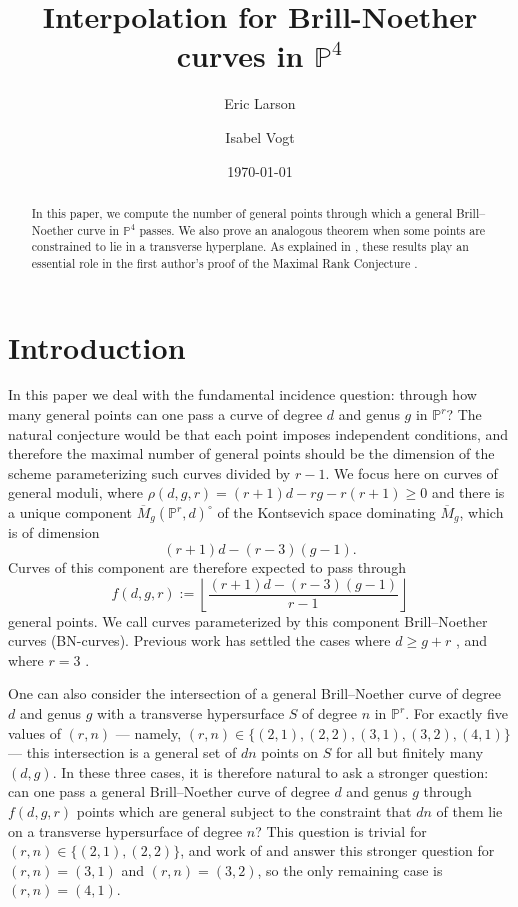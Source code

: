 \documentclass[11pt]{amsart}
\newcommand{\pp}{\mathbb{P}}
\renewcommand{\bar}{\overline}
\newcommand{\defi}[1]{\textsf{#1}}
\theoremstyle{definition}
\theoremstyle{remark}
\begin{document}
\title[Interpolation for curves in $\pp^4$]{Interpolation for Brill-Noether curves in $\pp^4$}
\author{Eric Larson}
\address{Department of Mathematics, Stanford University, Stanford, CA 94305}
\author{Isabel Vogt}
\address{Department of Mathematics, Massachusetts Institute of Technology, Cambridge, MA 02139}
\date{\today}

\maketitle

\begin{abstract}
In this paper, we compute the number of general points through which a general Brill--Noether curve in $\pp^4$ passes.
We also prove an analogous theorem when some points
are constrained to lie in a transverse hyperplane.  As explained in \cite{over}, these results play an essential role in the first author's proof of the Maximal Rank Conjecture \cite{mrc}.
\end{abstract}

\section{Introduction}

In this paper we deal with the fundamental incidence question: through how many general points can one pass a curve of degree $d$ and genus $g$ in $\pp^r$?  The natural conjecture would be that each point imposes independent conditions, and therefore the maximal number of general points should be the dimension of the scheme parameterizing such curves divided by $r-1$.
We focus here on curves of general moduli, where $\rho(d,g,r) = (r+1)d - rg - r(r+1) \geq 0$ and there is a unique component $\bar{M}_g(\pp^r, d)^\circ$ of the Kontsevich space dominating $\bar{M}_g$,
which is of dimension
\[(r + 1) d - (r - 3)(g - 1).\]
Curves of this component are therefore expected to pass through
\[f(d, g, r) := \left\lfloor \frac{(r + 1)d - (r - 3)(g - 1)}{r - 1}\right\rfloor\]
general points.
We call curves parameterized by this component \defi{Brill--Noether curves} (BN-curves).  Previous work has settled the cases where $d \geq g + r$ \cite{joint}, and where $r=3$ \cite{vogt}.  


One can also consider the intersection of a general Brill--Noether curve
of degree $d$ and genus $g$ with a transverse hypersurface $S$ of degree $n$ in $\pp^r$.
For exactly five values of $(r, n)$ --- namely, $(r, n) \in \{(2,1),(2,2),(3, 1), (3, 2), (4, 1)\}$ --- this
intersection is a general set of $dn$ points on $S$
for all but finitely many $(d, g)$.
In these three cases, it is therefore natural to ask a stronger question: can
one pass a general Brill--Noether curve of degree $d$ and genus $g$
through $f(d, g, r)$ points which are general subject to the constraint that
$dn$ of them lie on a transverse hypersurface of degree $n$?
This question is trivial for $(r,n) \in \{(2,1), (2,2)\}$, and work of \cite{vogt} and \cite{quadrics} answer this stronger question
for $(r, n) = (3, 1)$ and $(r, n) = (3, 2)$,
so the only remaining case is $(r, n) = (4, 1)$.
\end{document}

